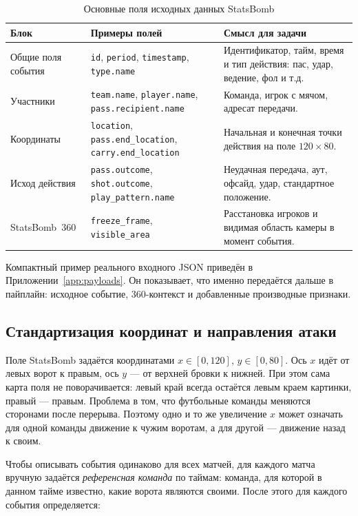 \documentclass[a4paper,14pt]{extarticle}
\numberwithin{table}{section}
\numberwithin{figure}{section}
\numberwithin{equation}{section}
\begin{document}
\begin{table}[H]
\caption{Основные поля исходных данных StatsBomb}
\label{tab:statsbomb-fields}
\centering
\small
\begin{tabular}{p{}p{}p{}}
\toprule
\textbf{Блок} & \textbf{Примеры полей} & \textbf{Смысл для задачи} \\
\midrule
Общие поля события & \texttt{id}, \texttt{period}, \texttt{timestamp}, \texttt{type.name} & Идентификатор, тайм, время и тип действия: пас, удар, ведение, фол и т.д. \\
Участники & \texttt{team.name}, \texttt{player.name}, \texttt{pass.recipient.name} & Команда, игрок с мячом, адресат передачи. \\
Координаты & \texttt{location}, \texttt{pass.end\_location}, \texttt{carry.end\_location} & Начальная и конечная точки действия на поле $120 \times 80$. \\
Исход действия & \texttt{pass.outcome}, \texttt{shot.outcome}, \texttt{play\_pattern.name} & Неудачная передача, аут, офсайд, удар, стандартное положение. \\
StatsBomb~360 & \texttt{freeze\_frame}, \texttt{visible\_area} & Расстановка игроков и видимая область камеры в момент события. \\
\bottomrule
\end{tabular}
\end{table}

Компактный пример реального входного JSON приведён в Приложении~\ref{app:payloads}. Он показывает, что именно передаётся дальше в пайплайн: исходное событие, 360-контекст и добавленные производные признаки.

\subsection{Стандартизация координат и направления атаки}

Поле StatsBomb задаётся координатами $x \in [0,120]$, $y \in [0,80]$. Ось $x$ идёт от левых ворот к правым, ось $y$ --- от верхней бровки к нижней. При этом сама карта поля не поворачивается: левый край всегда остаётся левым краем картинки, правый --- правым. Проблема в том, что футбольные команды меняются сторонами после перерыва. Поэтому одно и то же увеличение $x$ может означать для одной команды движение к чужим воротам, а для другой --- движение назад к своим.

Чтобы описывать события одинаково для всех матчей, для каждого матча вручную задаётся \textit{референсная команда} по таймам: команда, для которой в данном тайме известно, какие ворота являются своими. После этого для каждого события определяется:
\end{document}
